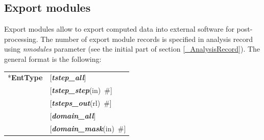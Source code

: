 \documentclass[a4paper]{article}
\makeatletter
\newcommand{\param}[1]{{\em #1}}
\newcommand{\keywordnotype}[1]{\mbox{{\it{\bf{#1}}}}}
\newcommand{\keyword}[2]{\mbox{{\keywordnotype{#1}\tiny (#2)}}}
\newcommand{\entKeyword}[1]{\mbox{{*{\bf{#1}}}}}
\newcommand{\field}[2]{\mbox{\keyword{#1}{#2}~\#}}
\newcommand{\optField}[2]{\mbox{[\field{#1}{#2}]}}
\newenvironment{record}[1][]{\begin{tabular}{|ll}}{\end{tabular}\\}
\newcommand{\recentry}[2]{{#1}&{#2}\\}
\newcounter{rcc}
\newenvironment{record}[1][\textwidth]{\setcounter{rcc}{0}\begin{tabular*}{#1}{|ll@{\extracolsep{\fill}}r}}{\end{tabular*}\\}
\newcommand{\recentry}[2]{\ifthenelse{\value{rcc}>0}{&$\backslash$ \\}{\setcounter{rcc}{1}}{#1}&{#2}}
\makeatother
\begin{document}
\subsection{Export modules}
\label{ExportModulesSec}
Export modules allow to export computed data into external software for
post-processing. The number of export module records is specified in
analysis record using \param{nmodules} parameter (see the initial part of section \ref{_AnalysisRecord}). The general format
is the following:\\
\begin{record}
\recentry{\entKeyword{EntType}}{[\keywordnotype{tstep\_all}]}
\recentry{}{\optField{tstep\_step}{in}} \recentry{}{\optField{tsteps\_out}{rl}}
\recentry{}{[\keywordnotype{domain\_all}]} \recentry{}{\optField{domain\_mask}{in}}
\end{record}
\end{document}
